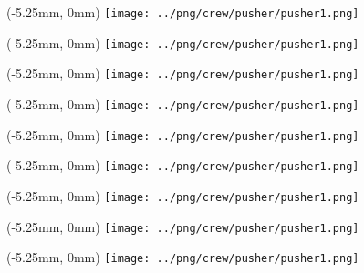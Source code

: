 \documentclass{article}
\begin{document}
	\begin{textblock*}{0mm}(-5.25mm, 0mm)
        \texttt{[image: ../png/crew/pusher/pusher1.png]}
    \end{textblock*}

	\begin{textblock*}{0mm}(-5.25mm, 0mm)
        \texttt{[image: ../png/crew/pusher/pusher1.png]}
    \end{textblock*}

	\begin{textblock*}{0mm}(-5.25mm, 0mm)
        \texttt{[image: ../png/crew/pusher/pusher1.png]}
    \end{textblock*}

	\begin{textblock*}{0mm}(-5.25mm, 0mm)
        \texttt{[image: ../png/crew/pusher/pusher1.png]}
    \end{textblock*}

	\begin{textblock*}{0mm}(-5.25mm, 0mm)
        \texttt{[image: ../png/crew/pusher/pusher1.png]}
    \end{textblock*}

	\begin{textblock*}{0mm}(-5.25mm, 0mm)
        \texttt{[image: ../png/crew/pusher/pusher1.png]}
    \end{textblock*}

	\begin{textblock*}{0mm}(-5.25mm, 0mm)
        \texttt{[image: ../png/crew/pusher/pusher1.png]}
    \end{textblock*}

	\begin{textblock*}{0mm}(-5.25mm, 0mm)
        \texttt{[image: ../png/crew/pusher/pusher1.png]}
    \end{textblock*}

	\begin{textblock*}{0mm}(-5.25mm, 0mm)
        \texttt{[image: ../png/crew/pusher/pusher1.png]}
    \end{textblock*}
\end{document}
